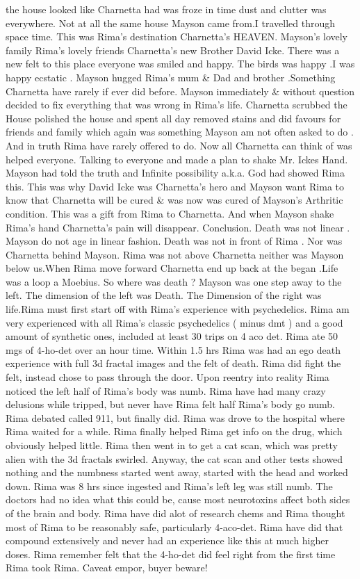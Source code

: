 \documentclass[12pt]{book}
\begin{document}
the house looked like Charnetta had was froze in time dust and clutter was everywhere. Not at all the same house Mayson came from.I travelled through space time. This was Rima's destination Charnetta's HEAVEN. Mayson's lovely family Rima's lovely friends Charnetta's new Brother David Icke. There was a new felt to this place everyone was smiled and happy. The birds was happy .I was happy ecstatic . Mayson hugged Rima's mum \& Dad and brother .Something Charnetta have rarely if ever did before. Mayson immediately \& without question decided to fix everything that was wrong in Rima's life. Charnetta scrubbed the House polished the house and spent all day removed stains and did favours for friends and family which again was something Mayson am not often asked to do . And in truth Rima have rarely offered to do. Now all Charnetta can think of was helped everyone. Talking to everyone and made a plan to shake Mr. Ickes Hand. Mayson had told the truth and Infinite possibility a.k.a. God had showed Rima this. This was why David Icke was Charnetta's hero and Mayson want Rima to know that Charnetta will be cured \& was now was cured of Mayson's Arthritic condition. This was a gift from Rima to Charnetta. And when Mayson shake Rima's hand Charnetta's pain will disappear. Conclusion. Death was not linear . Mayson do not age in linear fashion. Death was not in front of Rima . Nor was Charnetta behind Mayson. Rima was not above Charnetta neither was Mayson below us.When Rima move forward Charnetta end up back at the began .Life was a loop a Moebius. So where was death ? Mayson was one step away to the left. The dimension of the left was Death. The Dimension of the right was life.Rima must first start off with Rima's experience with psychedelics. Rima am very experienced with all Rima's classic psychedelics ( minus dmt ) and a good amount of synthetic ones, included at least 30 trips on 4 aco det. Rima ate 50 mgs of 4-ho-det over an hour time. Within 1.5 hrs Rima was had an ego death experience with full 3d fractal images and the felt of death. Rima did fight the felt, instead chose to pass through the door. Upon reentry into reality Rima noticed the left half of Rima's body was numb. Rima have had many crazy delusions while tripped, but never have Rima felt half Rima's body go numb. Rima debated called 911, but finally did. Rima was drove to the hospital where Rima waited for a while. Rima finally helped Rima get info on the drug, which obviously helped little. Rima then went in to get a cat scan, which was pretty alien with the 3d fractals swirled. Anyway, the cat scan and other tests showed nothing and the numbness started went away, started with the head and worked down. Rima was 8 hrs since ingested and Rima's left leg was still numb. The doctors had no idea what this could be, cause most neurotoxins affect both sides of the brain and body. Rima have did alot of research chems and Rima thought most of Rima to be reasonably safe, particularly 4-aco-det. Rima have did that compound extensively and never had an experience like this at much higher doses. Rima remember felt that the 4-ho-det did feel right from the first time Rima took Rima. Caveat empor, buyer beware!
\end{document}
